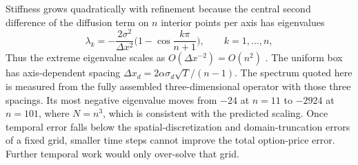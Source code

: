 Stiffness grows quadratically with refinement because the central second difference of the diffusion term on $n$ interior points per axis has eigenvalues
\[
\lambda_k = -\frac{2\sigma^2}{\Delta x^2}\Big(1 - \cos\frac{k\pi}{n+1}\Big),
\qquad k = 1, \ldots, n,
\]
Thus the extreme eigenvalue scales as $O(\Delta x^{-2})=O(n^2)$ \cite{hundsdorfer-verwer-2003}. The uniform box has axis-dependent spacing
$\Delta x_d=2\alpha\sigma_d\sqrt{T}/(n-1)$. The spectrum quoted here is measured from the fully assembled three-dimensional operator with those three spacings. Its most negative eigenvalue moves from $-24$ at $n=11$ to $-2924$ at $n=101$, where $N=n^3$, which is consistent with the predicted scaling. Once temporal error falls below the spatial-discretization and domain-truncation errors of a fixed grid, smaller time steps cannot improve the total option-price error. Further temporal work would only over-solve that grid.

